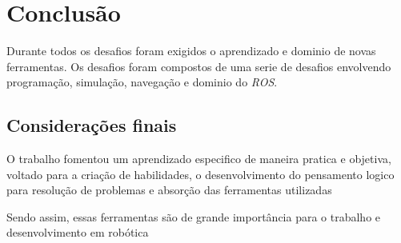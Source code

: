 \chapter{Conclusão}
\label{chap:conc}

Durante todos os desafios foram exigidos o aprendizado e dominio de novas ferramentas. Os desafios foram compostos de uma serie de desafios envolvendo programação, simulação, navegação e dominio do \textit{ROS}. 



\section{Considerações finais}
\label{sec:consid}

O trabalho fomentou um aprendizado especifico de maneira pratica e objetiva, voltado para a criação de habilidades, o desenvolvimento do pensamento logico para resolução de problemas e absorção das ferramentas utilizadas 

Sendo assim, essas ferramentas são de grande importância para o trabalho e desenvolvimento em robótica



